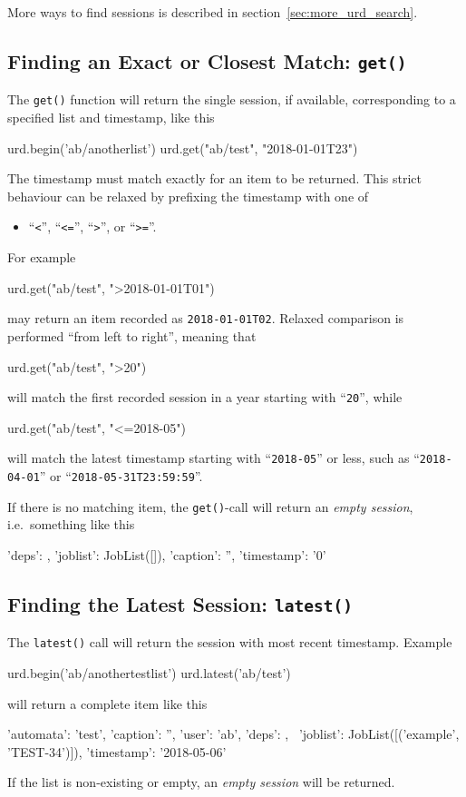 More ways to find sessions is described in
section~\ref{sec:more_urd_search}.



\subsection{Finding an Exact or Closest Match:  \texttt{get()}}
\label{sec:urd_get}

The \texttt{get()} function will return the single session, if
available, corresponding to a specified list and timestamp, like this
\begin{python}
urd.begin('ab/anotherlist')
urd.get("ab/test", "2018-01-01T23")
\end{python}
The timestamp must match exactly for an item to be returned.  This
strict behaviour can be relaxed by prefixing the timestamp with one of
\begin{itemize}
\item[] ``\texttt{<}'', ``\texttt{<=}'', ``\texttt{>}'', or ``\texttt{>=}''.
\end{itemize}
For example
\begin{python}
urd.get("ab/test", ">2018-01-01T01")
\end{python}
may return an item recorded as \texttt{2018-01-01T02}.  Relaxed
comparison is performed ``from left to right'', meaning that
\begin{python}
urd.get("ab/test", ">20")
\end{python}
will match the first recorded session in a year starting with
``\texttt{20}'', while
\begin{python}
urd.get("ab/test", "<=2018-05")
\end{python}
will match the latest timestamp starting with ``\texttt{2018-05}'' or less,
such as ``\texttt{2018-04-01}'' or ``\texttt{2018-05-31T23:59:59}''.

If there is no matching item, the \texttt{get()}-call will return
an \textsl{empty session}, i.e.\ something like this
\begin{python}
{'deps': {}, 'joblist': JobList([]), 'caption': '', 'timestamp': '0'}
\end{python}




\subsection{Finding the Latest Session:  \texttt{latest()}}
The \texttt{latest()} call will return the session with most recent
timestamp.  Example
\begin{python}
urd.begin('ab/anothertestlist')
urd.latest('ab/test')
\end{python}
will return a complete item like this
\begin{shell}
{'automata': 'test', 'caption': '', 'user': 'ab', 'deps': {}, \
 'joblist': JobList([('example', 'TEST-34')]), 'timestamp': '2018-05-06'}
\end{shell}
If the list is non-existing or empty, an \textsl{empty session} will be returned.



